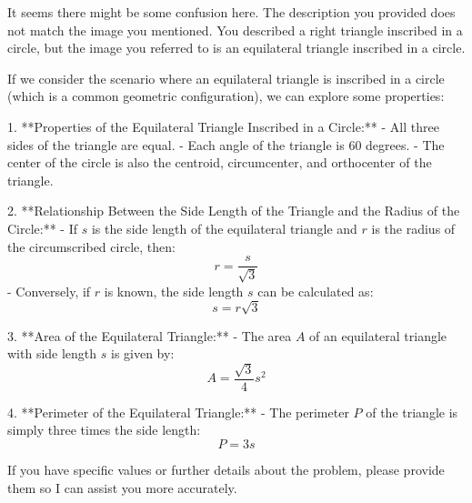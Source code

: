 It seems there might be some confusion here. The description you provided does not match the image you mentioned. You described a right triangle inscribed in a circle, but the image you referred to is an equilateral triangle inscribed in a circle.

If we consider the scenario where an equilateral triangle is inscribed in a circle (which is a common geometric configuration), we can explore some properties:

1. **Properties of the Equilateral Triangle Inscribed in a Circle:**
   - All three sides of the triangle are equal.
   - Each angle of the triangle is 60 degrees.
   - The center of the circle is also the centroid, circumcenter, and orthocenter of the triangle.

2. **Relationship Between the Side Length of the Triangle and the Radius of the Circle:**
   - If \( s \) is the side length of the equilateral triangle and \( r \) is the radius of the circumscribed circle, then:
     \[
     r = \frac{s}{\sqrt{3}}
     \]
   - Conversely, if \( r \) is known, the side length \( s \) can be calculated as:
     \[
     s = r \sqrt{3}
     \]

3. **Area of the Equilateral Triangle:**
   - The area \( A \) of an equilateral triangle with side length \( s \) is given by:
     \[
     A = \frac{\sqrt{3}}{4} s^2
     \]

4. **Perimeter of the Equilateral Triangle:**
   - The perimeter \( P \) of the triangle is simply three times the side length:
     \[
     P = 3s
     \]

If you have specific values or further details about the problem, please provide them so I can assist you more accurately.